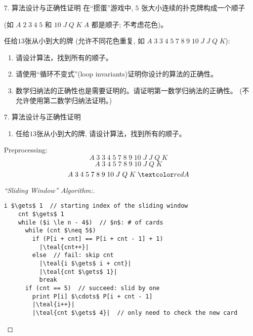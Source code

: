 \begin{frame}{}
  \begin{exampleblock}{$7.$ 算法设计与正确性证明}
    在``掼蛋''游戏中, $5$ 张大小连续的扑克牌构成一个顺子 

    (如 $A\; 2\; 3\; 4\; 5$ 和 $10\; J\; Q\; K\; A$ 都是顺子; 不考虑花色)。

    任给$13$张从小到大的牌 (允许不同花色重复, 如 $A\; 3\; 3\; 4\; 5\; 7\; 8\; 9\; 10\; J\; J\; Q\; K$):
    \begin{enumerate}[(1)]
      \item 请设计算法，找到所有的顺子。 
      \item 请使用``循环不变式''\;(loop invariants)证明你设计的算法的正确性。
      \item 数学归纳法的正确性也是需要证明的。请证明第一数学归纳法的正确性。 
	(不允许使用第二数学归纳法证明。)
    \end{enumerate}
  \end{exampleblock}
\end{frame}

\begin{frame}{}
  \begin{exampleblock}{$7.$ 算法设计与正确性证明}
    \begin{enumerate}[(1)]
      \item 任给$13$张从小到大的牌, 请设计算法，找到所有的顺子。 
    \end{enumerate}
  \end{exampleblock}

  \begin{alertblock}{Preprocessing:}
    \pause
    \[
      A\; 3\; 3\; 4\; 5\; 7\; 8\; 9\; 10\; J\; J\; Q\; K
    \]
    \pause
    \[
      A\; 3\; 4\; 5\; 7\; 8\; 9\; 10\; J\; Q\; K
    \]
    \pause
    \[
      A\; 3\; 4\; 5\; 7\; 8\; 9\; 10\; J\; Q\; K\; \red{A}
    \]
  \end{alertblock}
\end{frame}

\begin{frame}[fragile]{}
  \begin{proof}[``Sliding Window'' Algorithm:]
    \begin{lstlisting}[style = CStyle]
    i $\gets$ 1  // starting index of the sliding window
    cnt $\gets$ 1
    while ($i \le n - 4$)  // $n$: # of cards
      while (cnt $\neq 5$)
        if (P[i + cnt] == P[i + cnt - 1] + 1)
          |\teal{cnt++}|
        else  // fail: skip cnt
          |\teal{i $\gets$ i + cnt}|
          |\teal{cnt $\gets$ 1}|
          break
      if (cnt == 5)  // succeed: slid by one
        print P[i] $\cdots$ P[i + cnt - 1]
        |\teal{i++}|
        |\teal{cnt $\gets$ 4}|  // only need to check the new card
    \end{lstlisting}
  \end{proof}
\end{frame}

